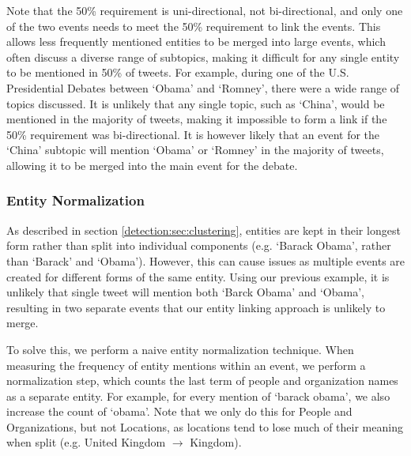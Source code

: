 Note that the 50\% requirement is uni-directional, not bi-directional, and only one of the two events needs to meet the 50\% requirement to link the events.
This allows less frequently mentioned entities to be merged into large events, which often discuss a diverse range of subtopics, making it difficult for any single entity to be mentioned in 50\% of tweets.
For example, during one of the U.S. Presidential Debates between `Obama' and `Romney', there were a wide range of topics discussed.
It is unlikely that any single topic, such as `China', would be mentioned in the majority of tweets, making it impossible to form a link if the 50\% requirement was bi-directional.
It is however likely that an event for the `China' subtopic will mention `Obama' or `Romney' in the majority of tweets, allowing it to be merged into the main event for the debate.

\subsubsection{Entity Normalization}
\label{sec:entityNorm}
As described in section \ref{detection:sec:clustering}, entities are kept in their longest form rather than split into individual components (e.g. `Barack Obama', rather than `Barack' and `Obama').
However, this can cause issues as multiple events are created for different forms of the same entity.
Using our previous example, it is unlikely that single tweet will mention both `Barck Obama' and `Obama', resulting in two separate events that our entity linking approach is unlikely to merge.

To solve this, we perform a naive entity normalization technique.
When measuring the frequency of entity mentions within an event, we perform a normalization step, which counts the last term of people and organization names as a separate entity.
For example, for every mention of `barack obama', we also increase the count of `obama'.
Note that we only do this for People and Organizations, but not Locations, as locations tend to lose much of their meaning when split (e.g. United Kingdom $\rightarrow$ Kingdom).